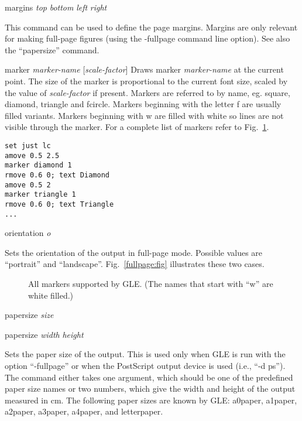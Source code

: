 \begin{commanddescription}
\item[{\sf margins {\it top} {\it bottom} {\it left} {\it right}}]

This command can be used to define the page margins. Margins are only relevant for making full-page figures (using the -fullpage command line option). See also the ``papersize'' command.

\item[{\sf marker {\it marker-name} [{\it scale-factor}]}  ]
  Draws marker {\it marker-name} at the current point.  The size of the marker
is proportional to the current font size, scaled by the value of
{\it scale-factor} if present.  Markers are referred to by name, eg.
{\sf square}, {\sf diamond}, {\sf triangle} and {\sf fcircle}.  Markers
beginning with the letter {\sf f} are usually filled variants.  Markers
beginning with {\sf w} are filled with white so lines are not visible
through the marker. For a complete
list of markers refer to Fig.~\ref{mark:fig}.

\begin{Verbatim}
set just lc
amove 0.5 2.5
marker diamond 1
rmove 0.6 0; text Diamond
amove 0.5 2
marker triangle 1
rmove 0.6 0; text Triangle
...
\end{Verbatim}

\item[{\sf orientation {\it o}}]\label{orient:cmd}

Sets the orientation of the output in full-page mode. Possible values are ``portrait'' and ``landscape''. Fig.~\ref{fullpage:fig} illustrates these two cases.

\begin{figure}[tb]
\centering
\mbox{}
\caption{\label{mark:fig}All markers supported by GLE. (The names that start with ``w'' are white filled.)}
\end{figure}

\item[{\sf papersize {\it size}}]\label{papsiz:cmd}
\item[{\sf papersize {\it width} {\it height}}]

Sets the paper size of the output. This is used only when GLE is run with the option ``-fullpage'' or when the PostScript output device is used (i.e., ``-d ps''). The command either takes one argument, which should be one of the predefined paper size names or two numbers, which give the width and height of the output measured in cm. The following paper sizes are known by GLE: a0paper, a1paper, a2paper, a3paper, a4paper, and letterpaper.


\end{commanddescription}
